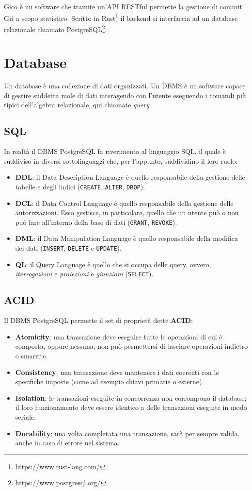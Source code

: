 Gico è un software che tramite un'API RESTful permette la gestione di commit Git a scopo statistico.
Scritto in Rust\footnote{https://www.rust-lang.com/} il backend si interfaccia ad un database relazionale chiamato PostgreSQL\footnote{https://www.postgresql.org/}.
\section{Database}
Un database è una collezione di dati organizzati. Un DBMS è un software capace di gestire suddetta mole di dati interagendo con l'utente eseguendo i comandi più tipici dell'algebra relazionale, qui chiamate \textit{query}.\\
\subsection{SQL}
In realtà il DBMS PostgreSQL fa riverimento al linguaggio SQL, il quale è suddiviso in diversi sottolinguaggi che, per l'appunto, suddividino il loro ruolo:
\begin{itemize}
	\item \textbf{DDL}: il Data Description Language è quello responsabile della gestione delle tabelle e degli indici (\verb|CREATE|, \verb|ALTER|, \verb|DROP|).
	\item \textbf{DCL}: il Data Control Language è quello responsabile della gestione delle autorizzazioni. Esso gestisce, in particolare, quello che un utente può o non può fare all'interno della base di dati (\verb|GRANT|, \verb|REVOKE|).
	\item \textbf{DML}: il Data Manipulation Language è quello responsabile della modifica dei dati (\verb|INSERT|, \verb|DELETE| e \verb|UPDATE|).
	\item \textbf{QL}: il Query Language è quello che si occupa delle query, ovvero, \textit{iterrogazioni} e \textit{proiezioni} e \textit{giunzioni} (\verb|SELECT|).
\end{itemize}

\subsection{ACID}
Il DBMS PostgreSQL permette il set di proprietà dette \textbf{ACID}:
\begin{itemize}
	\item \textbf{Atomicity}: una transazione deve eseguire tutte le operazioni di cui è composta, oppure nessuna; non può permettersi di lasciare operazioni indietro o smarrite.
	\item \textbf{Consistency}: una transazione deve mantenere i dati coerenti con le specifiche imposte (come ad esempio chiavi primarie o esterne).
	\item \textbf{Isolation}: le transazioni eseguite in concorrenza non corrompono il database; il loro funzionamento deve essere identico a delle transazioni eseguite in modo seriale.
	\item \textbf{Durability}: una volta completata una transazione, sarà per sempre valida, anche in caso di errore nel sistema.
\end{itemize}

